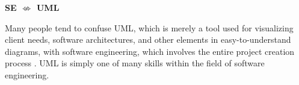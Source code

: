 \vspace{1cm}
\begin{tcolorbox}[title=Difference Between UML \& SE]
 \begin{center}
    \textbf{SE $\not\Leftrightarrow$ UML}
\end{center}

Many people tend to confuse UML, which is merely a tool used for visualizing client needs, software architectures, and other
elements in easy-to-understand diagrams, with software engineering, which involves the entire project creation process . 
UML is simply one of many skills within the field of software engineering.
\end{tcolorbox}













